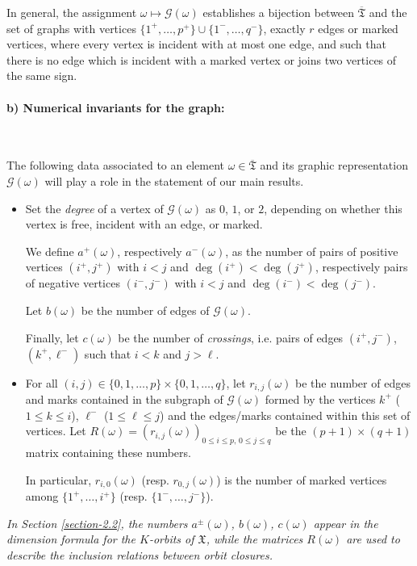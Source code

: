 \documentclass[ALCO,Unicode]{cedram}
\newcommand{\ppermutationsof}{\mathfrak{T}}
\newcommand{\parameters}{\overline{\ppermutationsof}}
\newcommand{\Xfv}{\mathfrak{X}}
\begin{document}
In general, the assignment $\omega\mapsto\mathcal{G}(\omega)$ establishes a bijection between $\parameters$ and the set of graphs with vertices %
$\{1^+,\ldots,p^+\}\cup\{1^-,\ldots,q^-\}$,
exactly $r$ edges or marked vertices, where every vertex is incident with at most one edge, and such that there is no edge which is incident with a marked vertex or joins two vertices of the same sign.


\paragraph{\bf b) Numerical invariants for the graph:}\

The following data associated to an element $\omega\in\parameters$ and its graphic representation $\mathcal{G}(\omega)$ will play a role in the statement of our main results.
\begin{itemize}
\item Set the {\em degree} of a vertex of $\mathcal{G}(\omega)$ as $0$, $1$, or $2$, depending on whether this vertex is free, incident with an edge, or marked.

We define $a^+(\omega)$, respectively $a^-(\omega)$, as the number of pairs
of positive vertices $(i^+,j^+)$ with $i<j$ and $\deg(i^+)<\deg(j^+)$,
respectively pairs of negative vertices $(i^-,j^-)$ with $i<j$ and $\deg(i^-)<\deg(j^-)$.

Let $b(\omega)$ be the number of edges of $\mathcal{G}(\omega)$.

Finally, let $c(\omega)$ be the number of \textit{crossings}, i.e. pairs of edges $(i^+,j^-)$, $(k^+,\ell^-)$ such that $i<k$ and $j>\ell$.

\item For all $(i,j)\in\{0,1,\ldots,p\}\times\{0,1,\ldots,q\}$, let $r_{i,j}(\omega)$ be the number of edges and marks contained in the subgraph of $\mathcal{G}(\omega)$ formed by the vertices $k^+$ ($1\leq k\leq i$), $\ell^-$ ($1\leq \ell\leq j$) and the edges/marks contained within this set of vertices. Let $R(\omega)=\left( r_{i,j}(\omega) \right)_{0\leq i\leq p,\,0\leq j\leq q}$ be the $(p+1)\times(q+1)$ matrix containing these numbers.

In particular, $r_{i,0}(\omega)$ (resp. $r_{0,j}(\omega)$) is the
number of marked vertices among
$\{1^+,\ldots,i^+\}$ (resp. $\{1^-,\ldots,j^-\}$).
\end{itemize}
{\em In Section \ref{section-2.2}, the numbers $a^\pm(\omega)$, $b(\omega)$, $c(\omega)$ appear in the dimension formula for the $K$-orbits of $\Xfv$, while the matrices $R(\omega)$ are used to describe the inclusion relations between orbit closures.}
\end{document}
